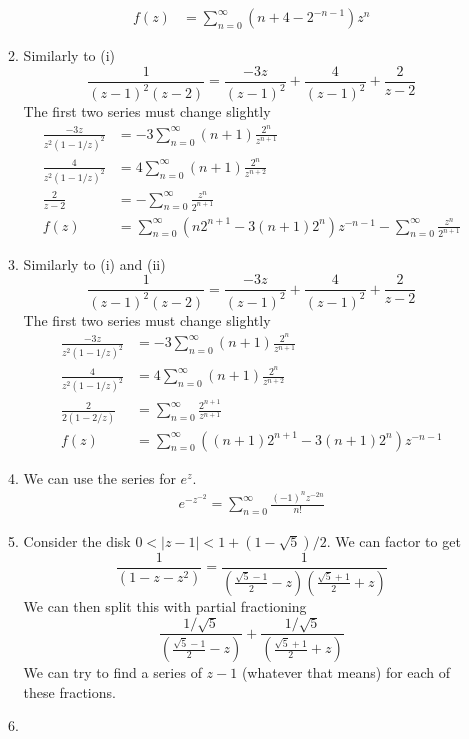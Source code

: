 \documentclass{article}
\begin{document}
\begin{enumerate}
\begin{enumerate}[label=(\roman*)]
\begin{align*}
            f(z)&=\sum_{n=0}^\infty (n+4-2^{-n-1})z^n
          \end{align*}
        \item
          Similarly to (i)
          \[\frac{1}{(z-1)^2(z-2)}=\frac{-3z}{(z-1)^2}+\frac{4}{(z-1)^2}+\frac{2}{z-2}\]
          The first two series must change slightly
          \begin{align*}
            \frac{-3z}{z^2(1-1/z)^2}
            &=-3\sum_{n=0}^\infty(n+1)\frac{2^n}{z^{n+1}}\\
            \frac{4}{z^2(1-1/z)^2}
            &=4\sum_{n=0}^\infty(n+1)\frac{2^n}{z^{n+2}}\\
            \frac{2}{z-2}
            &=-\sum_{n=0}^\infty\frac{z^n}{2^{n+1}}\\
            f(z)&=\sum_{n=0}^\infty(n2^{n+1}-3(n+1)2^n)z^{-n-1}-\sum_{n=0}^\infty\frac{z^n}{2^{n+1}}
          \end{align*}
        \item
          Similarly to (i) and (ii)
          \[\frac{1}{(z-1)^2(z-2)}=\frac{-3z}{(z-1)^2}+\frac{4}{(z-1)^2}+\frac{2}{z-2}\]
          The first two series must change slightly
          \begin{align*}
            \frac{-3z}{z^2(1-1/z)^2}
            &=-3\sum_{n=0}^\infty(n+1)\frac{2^n}{z^{n+1}}\\
            \frac{4}{z^2(1-1/z)^2}
            &=4\sum_{n=0}^\infty(n+1)\frac{2^n}{z^{n+2}}\\
            \frac{2}{2(1-2/z)}
            &=\sum_{n=0}^\infty\frac{2^{n+1}}{z^{n+1}}\\
            f(z)&=\sum_{n=0}^\infty((n+1)2^{n+1}-3(n+1)2^n)z^{-n-1}
          \end{align*}
        \item
          We can use the series for $e^z$.
          \begin{align*}
            e^{-z^{-2}}=\sum_{n=0}^\infty\frac{(-1)^nz^{-2n}}{n!}
          \end{align*}
        \item
          Consider the disk $0<|z-1|<1+(1-\sqrt5)/2$. We can factor to get
          \[\frac{1}{(1-z-z^2)}=\frac{1}{(\frac{\sqrt{5}-1}{2}-z)(\frac{\sqrt{5}+1}{2}+z)}\]
          We can then split this with partial fractioning
          \[\frac{1/\sqrt{5}}{(\frac{\sqrt{5}-1}{2}-z)}
           +\frac{1/\sqrt{5}}{(\frac{\sqrt{5}+1}{2}+z)}\]
          We can try to find a series of $z-1$ (whatever that means) for each of these fractions.
        \item

\end{enumerate}
\end{enumerate}
\end{document}
